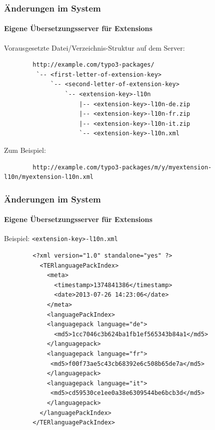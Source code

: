 
\begin{frame}[fragile]
	\frametitle{Änderungen im System}
	\framesubtitle{Eigene Übersetzungsserver für Extensions}

	Vorausgesetzte Datei/Verzeichnis-Struktur auf dem Server:

	\begin{lstlisting}
		http://example.com/typo3-packages/
		 `-- <first-letter-of-extension-key>
		     `-- <second-letter-of-extension-key>
		         `-- <extension-key>-l10n
		             |-- <extension-key>-l10n-de.zip
		             |-- <extension-key>-l10n-fr.zip
		             |-- <extension-key>-l10n-it.zip
		             `-- <extension-key>-l10n.xml
	\end{lstlisting}

	Zum Beispiel:

	\begin{lstlisting}
		http://example.com/typo3-packages/m/y/myextension-l10n/myextension-l10n.xml
	\end{lstlisting}

\end{frame}


\begin{frame}[fragile]
	\frametitle{Änderungen im System}
	\framesubtitle{Eigene Übersetzungsserver für Extensions}

	Beispiel: \texttt{<extension-key>-l10n.xml}

	\lstset{
		basicstyle=\tiny\ttfamily
	}

	\begin{lstlisting}
		<?xml version="1.0" standalone="yes" ?>
		  <TERlanguagePackIndex>
		    <meta>
		      <timestamp>1374841386</timestamp>
		      <date>2013-07-26 14:23:06</date>
		    </meta>
		    <languagePackIndex>
		    <languagepack language="de">
		      <md5>1cc7046c3b624ba1fb1ef565343b84a1</md5>
		    </languagepack>
		    <languagepack language="fr">
		     <md5>f00f73ae5c43cb68392e6c508b65de7a</md5>
		    </languagepack>
		    <languagepack language="it">
		     <md5>cd59530ce1ee0a38e6309544be6bcb3d</md5>
		    </languagepack>
		  </languagePackIndex>
		</TERlanguagePackIndex>
	\end{lstlisting}

\end{frame}

